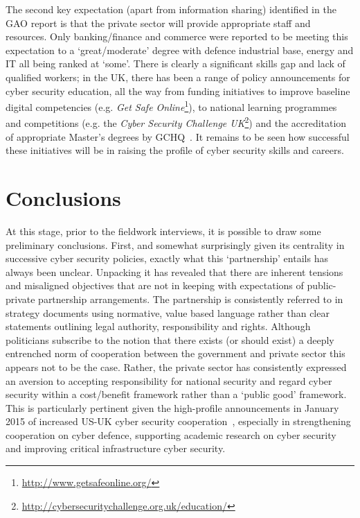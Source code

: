 \documentclass[a4paper,11pt]{article}
\begin{document}
The second key expectation (apart from information sharing) identified
in the GAO report is that the private sector will provide appropriate
staff and resources. Only banking/finance and commerce were reported
to be meeting this expectation to a `great/moderate' degree with
defence industrial base, energy and IT all being ranked at
`some'. There is clearly a significant skills gap and lack of
qualified workers; in the UK, there has been a range of policy
announcements for cyber security education, all the way from funding
initiatives to improve baseline digital competencies (e.g. {\emph{Get
Safe Online}}\footnote{\url{http://www.getsafeonline.org/}}), to
national learning programmes and competitions (e.g. the {\emph{Cyber
Security Challenge
UK}}\footnote{\url{http://cybersecuritychallenge.org.uk/education/}})
and the accreditation of appropriate Master's degrees by
GCHQ~\cite{gchqmasters:2014}. It remains to be seen how successful
these initiatives will be in raising the profile of cyber security
skills and careers.

\section{Conclusions}

At this stage, prior to the fieldwork interviews, it is possible to
draw some preliminary conclusions. First, and somewhat surprisingly
given its centrality in successive cyber security policies, exactly
what this `partnership' entails has always been unclear.  Unpacking it
has revealed that there are inherent tensions and misaligned
objectives that are not in keeping with expectations of public-private
partnership arrangements. The partnership is consistently referred to
in strategy documents using normative, value based language rather
than clear statements outlining legal authority, responsibility and
rights. Although politicians subscribe to the notion that there exists
(or should exist) a deeply entrenched norm of cooperation between the
government and private sector this appears not to be the case. Rather,
the private sector has consistently expressed an aversion to accepting
responsibility for national security and regard cyber security within
a cost/benefit framework rather than a `public good' framework. This
is particularly pertinent given the high-profile announcements in
January 2015 of increased US-UK cyber security
cooperation~\cite{whitehouse:2015}, especially in strengthening
cooperation on cyber defence, supporting academic research on
cyber security and improving critical infrastructure cyber security.
\end{document}
